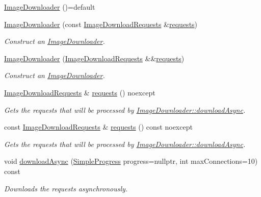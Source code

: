 \begin{DoxyCompactItemize}
\item 
\hyperlink{classdg_1_1deepcore_1_1imagery_1_1_image_downloader_ab12446188ca9974b707426862216943d}{Image\+Downloader} ()=default
\item 
\hyperlink{group___imagery_module_ga72fc422dd0b77c0a04e4f86b15d60fa3}{Image\+Downloader} (const \hyperlink{group___imagery_module_ga759e24100f96d6dee1eee94f4f1d6898}{Image\+Download\+Requests} \&\hyperlink{group___imagery_module_ga7c66e615a56d4f8e747cb3f0af302ca8}{requests})
\begin{DoxyCompactList}\small\item\em Construct an \hyperlink{classdg_1_1deepcore_1_1imagery_1_1_image_downloader}{Image\+Downloader}. \end{DoxyCompactList}\item 
\hyperlink{group___imagery_module_gaa2d0277480846121930f1a18e4ed7875}{Image\+Downloader} (\hyperlink{group___imagery_module_ga759e24100f96d6dee1eee94f4f1d6898}{Image\+Download\+Requests} \&\&\hyperlink{group___imagery_module_ga7c66e615a56d4f8e747cb3f0af302ca8}{requests})
\begin{DoxyCompactList}\small\item\em Construct an \hyperlink{classdg_1_1deepcore_1_1imagery_1_1_image_downloader}{Image\+Downloader}. \end{DoxyCompactList}\item 
\hyperlink{group___imagery_module_ga759e24100f96d6dee1eee94f4f1d6898}{Image\+Download\+Requests} \& \hyperlink{group___imagery_module_ga7c66e615a56d4f8e747cb3f0af302ca8}{requests} () noexcept
\begin{DoxyCompactList}\small\item\em Gets the requests that will be processed by \hyperlink{group___imagery_module_ga64b386de28c7445ef9e1b679d31147c7}{Image\+Downloader\+::download\+Async}. \end{DoxyCompactList}\item 
const \hyperlink{group___imagery_module_ga759e24100f96d6dee1eee94f4f1d6898}{Image\+Download\+Requests} \& \hyperlink{group___imagery_module_gafaeeb86aeb496d8e57515f17c098dc76}{requests} () const noexcept
\begin{DoxyCompactList}\small\item\em Gets the requests that will be processed by \hyperlink{group___imagery_module_ga64b386de28c7445ef9e1b679d31147c7}{Image\+Downloader\+::download\+Async}. \end{DoxyCompactList}\item 
void \hyperlink{group___imagery_module_ga64b386de28c7445ef9e1b679d31147c7}{download\+Async} (\hyperlink{group___utility_module_ga6763018df79e4bdbcd8cd14cea5342b2}{Simple\+Progress} progress=nullptr, int max\+Connections=10) const 
\begin{DoxyCompactList}\small\item\em Downloads the requests asynchronously. \end{DoxyCompactList}\end{DoxyCompactItemize}
